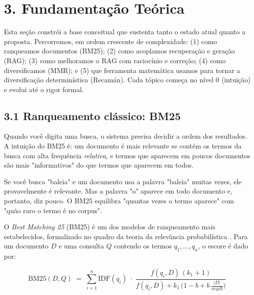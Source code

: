 
\section*{3. Fundamentação Teórica}

 Esta seção constrói a base conceitual que sustenta tanto o estado atual
quanto a proposta. Percorremos, em ordem crescente de complexidade: (1) como
ranqueamos documentos (BM25); (2) como acoplamos recuperação e geração (RAG);
(3) como melhoramos o RAG com raciocínio e correção; (4) como diversificamos
(MMR); e (5) que ferramenta matemática usamos para tornar a diversificação
determinística (Recamán). Cada tópico começa no nível 0 (intuição) e evolui até o
rigor formal.

\subsection*{3.1 Ranqueamento clássico: BM25}

 Quando você digita uma busca, o sistema precisa decidir a ordem dos
resultados. A intuição do BM25 é: um documento é mais relevante se contém os
termos da busca com alta frequência \emph{relativa}, e termos que aparecem em
poucos documentos são mais "informativos" do que termos que aparecem em todos.

\begin{intuicao}
Se você busca "baleia" e um documento usa a palavra "baleia" muitas vezes, ele
provavelmente é relevante. Mas a palavra "o" aparece em todo documento e, portanto,
diz pouco. O BM25 equilibra "quantas vezes o termo aparece" com "quão raro o termo
é no corpus".
\end{intuicao}

 O \emph{Best Matching 25} (BM25) é um dos modelos de ranqueamento mais
estabelecidos, formalizado no quadro da teoria da relevância probabilística
\cite{RobertsonZaragoza2009BM25}. Para um documento $D$ e uma consulta $Q$
contendo os termos $q_1,\dots,q_n$, o escore é dado por:

\begin{equation}
\label{eq:bm25}
\text{BM25}(D,Q)\;=\;\sum_{i=1}^{n}
\text{IDF}(q_i)\;\cdot\;
\frac{f(q_i,D)\,(k_1+1)}{f(q_i,D)+k_1\,\bigl(1-b+b\,\tfrac{|D|}{\text{avgdl}}\bigr)}
\end{equation}

